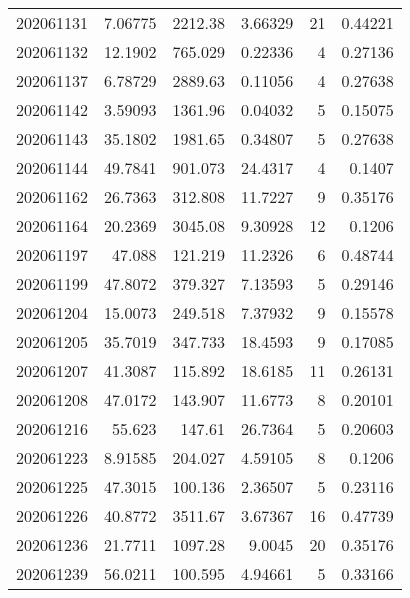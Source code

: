\begin{tabular}{rrrrrr}
 202061131 &          7.06775 &     2212.38   &            3.66329 &          21 & 0.44221 \\
 202061132 &         12.1902  &      765.029  &            0.22336 &           4 & 0.27136 \\
 202061137 &          6.78729 &     2889.63   &            0.11056 &           4 & 0.27638 \\
 202061142 &          3.59093 &     1361.96   &            0.04032 &           5 & 0.15075 \\
 202061143 &         35.1802  &     1981.65   &            0.34807 &           5 & 0.27638 \\
 202061144 &         49.7841  &      901.073  &           24.4317  &           4 & 0.1407  \\
 202061162 &         26.7363  &      312.808  &           11.7227  &           9 & 0.35176 \\
 202061164 &         20.2369  &     3045.08   &            9.30928 &          12 & 0.1206  \\
 202061197 &         47.088   &      121.219  &           11.2326  &           6 & 0.48744 \\
 202061199 &         47.8072  &      379.327  &            7.13593 &           5 & 0.29146 \\
 202061204 &         15.0073  &      249.518  &            7.37932 &           9 & 0.15578 \\
 202061205 &         35.7019  &      347.733  &           18.4593  &           9 & 0.17085 \\
 202061207 &         41.3087  &      115.892  &           18.6185  &          11 & 0.26131 \\
 202061208 &         47.0172  &      143.907  &           11.6773  &           8 & 0.20101 \\
 202061216 &         55.623   &      147.61   &           26.7364  &           5 & 0.20603 \\
 202061223 &          8.91585 &      204.027  &            4.59105 &           8 & 0.1206  \\
 202061225 &         47.3015  &      100.136  &            2.36507 &           5 & 0.23116 \\
 202061226 &         40.8772  &     3511.67   &            3.67367 &          16 & 0.47739 \\
 202061236 &         21.7711  &     1097.28   &            9.0045  &          20 & 0.35176 \\
 202061239 &         56.0211  &      100.595  &            4.94661 &           5 & 0.33166 \\

\end{tabular}
